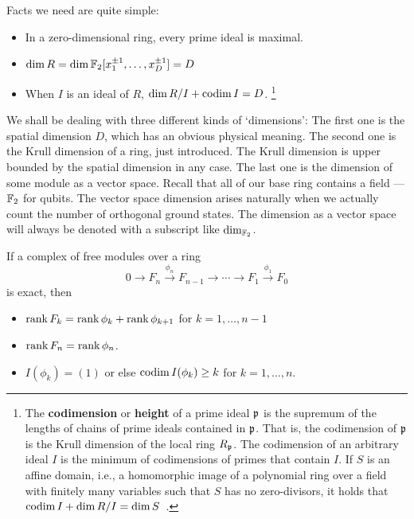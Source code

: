 Facts we need are quite simple:
\begin{itemize}
 \item In a zero-dimensional ring, every prime ideal is maximal.
 \item $\dim R = \dim \mathbb{F}_2[x_1^{\pm 1},\ldots,x_D^{\pm 1}] = D$
 \item When $I$ is an ideal of $R$, $\dim R/I + \mathop{\mathrm{codim}}\nolimits I = D$.%
\footnote{
The {\bf codimension} or {\bf height} of a prime ideal $\mathfrak{p}$ is 
the supremum of the lengths of chains of prime ideals contained in $\mathfrak{p}$.
That is, the codimension of $\mathfrak{p}$ is the Krull dimension of the local ring $R_{\mathfrak{p}}$.
The codimension of an arbitrary ideal $I$ is the minimum of codimensions of primes that contain $I$.
If $S$ is an affine domain, i.e., 
a homomorphic image of a polynomial ring over a field with finitely many variables
such that $S$ has no zero-divisors,
it holds that $\mathop{\mathrm{codim}}\nolimits I + \dim R/I = \dim S$~\cite[Chapter~13]{Eisenbud}.
}
\end{itemize}



We shall be dealing with three different kinds of `dimensions':
The first one is the spatial dimension $D$,
which has an obvious physical meaning.
The second one is the Krull dimension of a ring, just introduced.
The Krull dimension is upper bounded by the spatial dimension in any case.
The last one is the dimension of some module as a vector space.
Recall that all of our base ring contains a field --- $\mathbb{F}_2$ for qubits.
The vector space dimension arises naturally
when we actually count the number of orthogonal ground states.
The dimension as a vector space will always be denoted with a subscript like $\dim_{\mathbb{F}_2}$.


\begin{prop}
If a complex of free modules over a ring
\[
 0 \to F_n \xrightarrow{\phi_n} F_{n-1} \to \cdots \to F_1 \xrightarrow{\phi_1} F_0
\]
is exact, then
\begin{itemize}
\item $\mathop{\mathrm{rank}}\nolimits F_k = \mathop{\mathrm{rank}}\nolimits \phi_k + \mathop{\mathrm{rank}}\nolimits \phi_{k+1}$ for $k=1,\ldots,n-1$
\item $\mathop{\mathrm{rank}}\nolimits F_n = \mathop{\mathrm{rank}}\nolimits \phi_n$.
\item $I(\phi_k)=(1)$ or else $\mathop{\mathrm{codim}}\nolimits I(\phi_{k}) \ge k$ for $k=1,\ldots,n$.
\end{itemize}
\label{prop:exact-sequence}
\end{prop}

